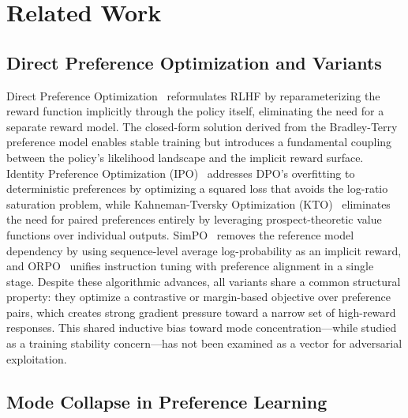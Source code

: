 \section{Related Work}
\label{sec:background}

\subsection{Direct Preference Optimization and Variants}

Direct Preference Optimization~\cite{rafailov2023dpo} reformulates RLHF by reparameterizing the reward function implicitly through the policy itself, eliminating the need for a separate reward model. The closed-form solution derived from the Bradley-Terry preference model enables stable training but introduces a fundamental coupling between the policy's likelihood landscape and the implicit reward surface. Identity Preference Optimization (IPO)~\cite{azar2024ipo} addresses DPO's overfitting to deterministic preferences by optimizing a squared loss that avoids the log-ratio saturation problem, while Kahneman-Tversky Optimization (KTO)~\cite{ethayarajh2024kto} eliminates the need for paired preferences entirely by leveraging prospect-theoretic value functions over individual outputs. SimPO~\cite{meng2024simpo} removes the reference model dependency by using sequence-level average log-probability as an implicit reward, and ORPO~\cite{hong2024orpo} unifies instruction tuning with preference alignment in a single stage. Despite these algorithmic advances, all variants share a common structural property: they optimize a contrastive or margin-based objective over preference pairs, which creates strong gradient pressure toward a narrow set of high-reward responses. This shared inductive bias toward mode concentration---while studied as a training stability concern---has not been examined as a vector for adversarial exploitation.

\subsection{Mode Collapse in Preference Learning}

